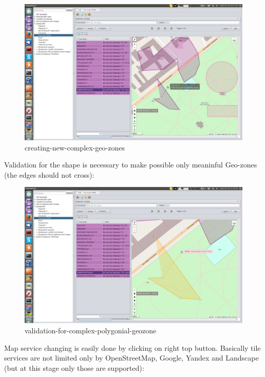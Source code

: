 \begin{figure}[!htp]
\centering
\includegraphics[width=16cm]{chapters/01-geozones/images/07-creating-new-complex-geo-zones.png}
\caption{creating-new-complex-geo-zones}\label{fig:07}
\end{figure}
Validation for the shape is necessary to make possible only meaninful Geo-zones (the edges should not cross):
\begin{figure}[!htp]
\centering
\includegraphics[width=16cm]{chapters/01-geozones/images/08-validation-for-complex-polygonial-geozone.png}
\caption{validation-for-complex-polygonial-geozone}\label{fig:08}
\end{figure}
Map service changing is easily done by clicking on right top button. Basically tile services are not
limited only by OpenStreetMap, Google, Yandex and Landscape (but at this stage only those are supported): 
